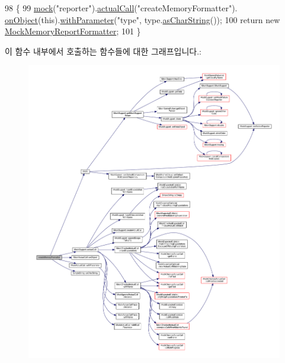 \begin{DoxyCode}
98     \{
99         \hyperlink{_mock_support_8h_ac44b0374b926cc12a3d8b24361f8a6a7}{mock}(\textcolor{stringliteral}{"reporter"}).\hyperlink{class_mock_support_a9b0ef024cdc513368395ef23d9e3af39}{actualCall}(\textcolor{stringliteral}{"createMemoryFormatter"}).
      \hyperlink{class_mock_actual_call_a6bef5025448607c237bdffeb49cae588}{onObject}(\textcolor{keyword}{this}).\hyperlink{class_mock_actual_call_a158f3ada8f73127b977d5353d4e4dea0}{withParameter}(\textcolor{stringliteral}{"type"}, type.\hyperlink{class_simple_string_af7c0efaf31f42553f05719903c830be1}{asCharString}());
100         \textcolor{keywordflow}{return} \textcolor{keyword}{new} \hyperlink{class_mock_memory_report_formatter}{MockMemoryReportFormatter};
101     \}
\end{DoxyCode}


이 함수 내부에서 호출하는 함수들에 대한 그래프입니다.\+:
\nopagebreak
\begin{figure}[H]
\begin{center}
\leavevmode
\includegraphics[width=350pt]{class_memory_reporter_plugin_under_test_af544ea81b03481a778ddd5bdd56b11d9_cgraph}
\end{center}
\end{figure}



